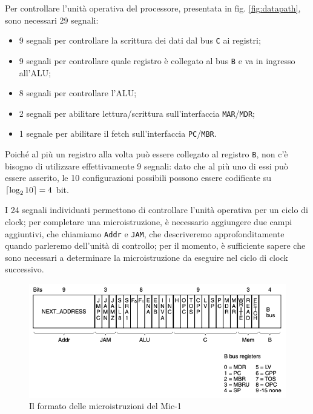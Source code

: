 \documentclass[a4paper,12pt]{scrreprt}
\DeclarePairedDelimiter{\ceil}{\lceil}{\rceil}
\begin{document}
Per controllare l'unità operativa del processore, presentata in fig.
\ref{fig:datapath}, sono necessari 29 segnali:
\begin{itemize}
    \item 9 segnali per controllare la scrittura dei dati dal bus \lstinline{C}
    ai registri;
    \item 9 segnali per controllare quale registro è collegato al bus
    \lstinline{B} e va in ingresso all'ALU;
    \item 8 segnali per controllare l'ALU;
    \item 2 segnali per abilitare lettura/scrittura sull'interfaccia
    \lstinline{MAR}/\lstinline{MDR};
    \item 1 segnale per abilitare il fetch sull'interfaccia
    \lstinline{PC}/\lstinline{MBR}.
\end{itemize}

Poiché al più un registro alla volta può essere collegato al registro
\lstinline{B}, non c'è bisogno di utilizzare effettivamente 9 segnali: dato che
al più uno di essi può essere asserito, le 10 configurazioni possibili possono
essere codificate su $\ceil{\log_{2}10} = 4$ bit.

I 24 segnali individuati permettono di controllare l'unità operativa per un
ciclo di clock; per completare una microistruzione, è necessario aggiungere due
campi aggiuntivi, che chiamiamo \lstinline{Addr} e \lstinline{JAM}, che
descriveremo approfonditamente quando parleremo dell'unità di controllo; per il
momento, è sufficiente sapere che sono necessari a determinare la
microistruzione da eseguire nel ciclo di clock successivo.

\begin{figure}
  \centering
  \includegraphics[width=\textwidth]{mu_instr.png}
  \caption{Il formato delle microistruzioni del Mic-1}\label{fig:mu_instr}
\end{figure}
\end{document}
